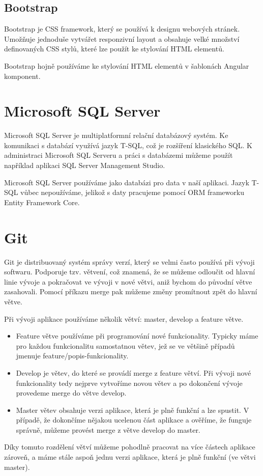 \subsection{Bootstrap}
Bootstrap je CSS framework, který se používá k designu webových stránek.
Umožňuje jednoduše vytvářet responzivní layout a obsahuje velké množství definovaných CSS stylů, které lze použít ke stylování HTML elementů.
\cite{BootstrapDocs}

Bootstrap hojně používáme ke stylování HTML elementů v šablonách Angular komponent.

\section{Microsoft SQL Server}
Microsoft SQL Server je multiplatformní relační databázový systém. Ke komunikaci s databází využívá jazyk T-SQL, což je rozšíření klasického SQL. K administraci Microsoft SQL Serveru a práci s databázemi můžeme použít například aplikaci SQL Server Management Studio.
\cite{SqlServerDocs}

Microsoft SQL Server používáme jako databázi pro data v naší aplikaci. Jazyk T-SQL vůbec nepoužíváme, jelikož s daty pracujeme pomocí ORM frameworku Entity Framework Core.

\section{Git}
Git je distribuovaný systém správy verzí, který se velmi často používá při vývoji softwaru. Podporuje tzv. větvení, což znamená, že se můžeme odloučit od hlavní linie vývoje a pokračovat ve vývoji v nové větvi, aniž bychom do původní větve zasahovali. Pomocí příkazu merge pak můžeme změny promítnout zpět do hlavní větve.
\cite{GitDocs}

Při vývoji aplikace používáme několik větví: master, develop a feature větve.
\begin{itemize}
	\item Feature větve používáme při programování nové funkcionality. Typicky máme pro každou funkcionalitu samostatnou větev, jež se ve většině případů jmenuje feature/popis-funkcionality.
	\item Develop je větev, do které se provádí merge z feature větví. Při vývoji nové funkcionality tedy nejprve vytvoříme novou větev a po dokončení vývoje provedeme merge do větve develop.
	\item Master větev obsahuje verzi aplikace, která je plně funkční a lze spustit. V případě, že dokončíme nějakou ucelenou část aplikace a ověříme, že funguje správně, můžeme provést merge z větve develop do master.
\end{itemize}
Díky tomuto rozdělení větví můžeme pohodlně pracovat na více částech aplikace zároveň, a máme stále aspoň jednu verzi aplikace, která je plně funkční (ve větvi master).

